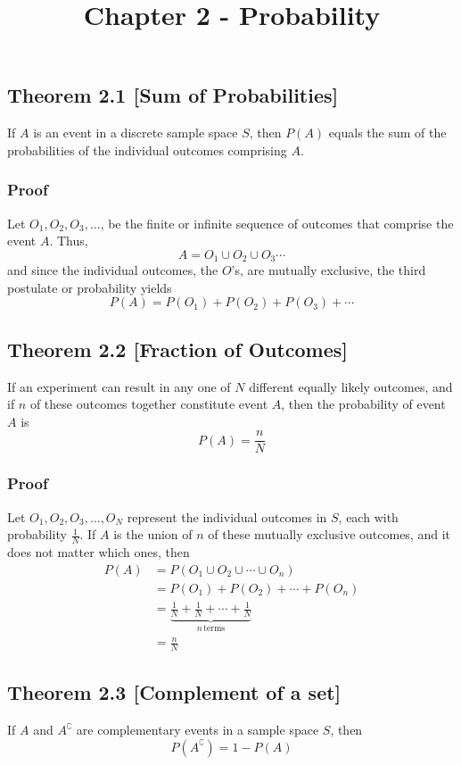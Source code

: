 \documentclass{article}
\title{Chapter 2 - Probability}
\begin{document}
\maketitle



\subsection*{Theorem 2.1 [Sum of Probabilities]}
If \(A\) is an event in a discrete sample space \(S\), then \(P(A)\) equals the sum of the probabilities of the individual outcomes comprising \(A\).

\subsubsection*{Proof}

Let \(O_1, O_2, O_3,\ldots\), be the finite or infinite sequence of outcomes that comprise the event \(A\). Thus,
\[A=O_1 \cup O_2 \cup O_3 \cdots \]
and since the individual outcomes, the \(O\)'s, are mutually exclusive, the third postulate or probability yields
\[P(A)=P(O_1)+P(O_2)+P(O_3)+\cdots \]

\subsection*{Theorem 2.2 [Fraction of Outcomes]}
If an experiment can result in any one of \(N\) different equally likely outcomes, and if \(n\) of these outcomes together constitute event \(A\), then the probability of event \(A\) is
\[P(A) = \frac{n}{N}\]

\subsubsection*{Proof}

Let \(O_1, O_2, O_3,\ldots,O_N\) represent the individual outcomes in \(S\), each with probability \(\frac{1}{N}\). If \(A\) is the union of \(n\) of these mutually exclusive outcomes, and it does not matter which ones, then
\begin{align*}
P(A)&=P(O_1 \cup O_2  \cup \cdots \cup O_n)\\
&=P(O_1) + P(O_2) + \cdots + P(O_n)\\
&=\underbrace{\frac{1}{N} + \frac{1}{N} + \cdots + \frac{1}{N}}_{n \, \text{terms}}\\
&=\frac{n}{N}
\end{align*}

\subsection*{Theorem 2.3 [Complement of a set]}
If \(A\) and \(A^\complement\) are complementary events in a sample space \(S\), then
\[P(A^\complement) = 1 - P(A)\]
\end{document}
